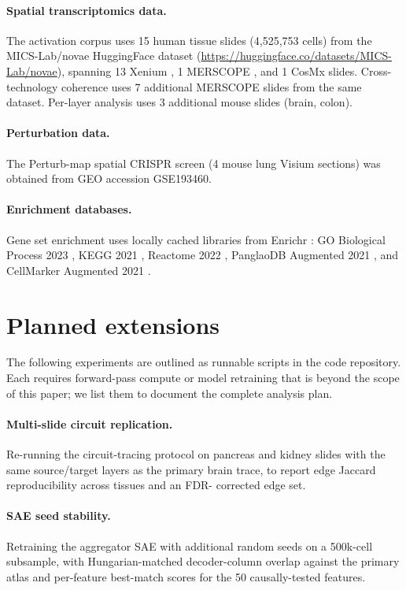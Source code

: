 \documentclass[11pt]{article}
\begin{document}
\paragraph{Spatial transcriptomics data.}
The activation corpus uses 15 human tissue slides (4{,}525{,}753 cells)
from the MICS-Lab/novae HuggingFace dataset
(\url{https://huggingface.co/datasets/MICS-Lab/novae}), spanning 13
Xenium \citep{xenium}, 1 MERSCOPE \citep{merfish}, and 1 CosMx slides.
Cross-technology coherence uses 7 additional MERSCOPE slides from the
same dataset. Per-layer analysis uses 3 additional mouse slides (brain,
colon).

\paragraph{Perturbation data.}
The Perturb-map spatial CRISPR screen \citep{perturbmap} (4 mouse lung
Visium sections) was obtained from GEO accession GSE193460.

\paragraph{Enrichment databases.}
Gene set enrichment uses locally cached libraries from Enrichr
\citep{enrichr}: GO Biological Process 2023 \citep{go2021}, KEGG 2021
\citep{kegg2000}, Reactome 2022 \citep{reactome2020}, PanglaoDB
Augmented 2021 \citep{panglao}, and CellMarker Augmented 2021
\citep{cellmarker2019}.

\appendix
\section{Planned extensions}
\label{app:scaffolds}

The following experiments are outlined as runnable scripts in the
code repository. Each requires forward-pass compute or model
retraining that is beyond the scope of this paper; we list them to
document the complete analysis plan.

\paragraph{Multi-slide circuit replication.}
Re-running the circuit-tracing protocol on pancreas and kidney slides
with the same source/target layers as the primary brain trace, to
report edge Jaccard reproducibility across tissues and an FDR-
corrected edge set.

\paragraph{SAE seed stability.}
Retraining the aggregator SAE with additional random seeds on a
500k-cell subsample, with Hungarian-matched decoder-column overlap
against the primary atlas and per-feature best-match scores for the
50 causally-tested features.
\end{document}
